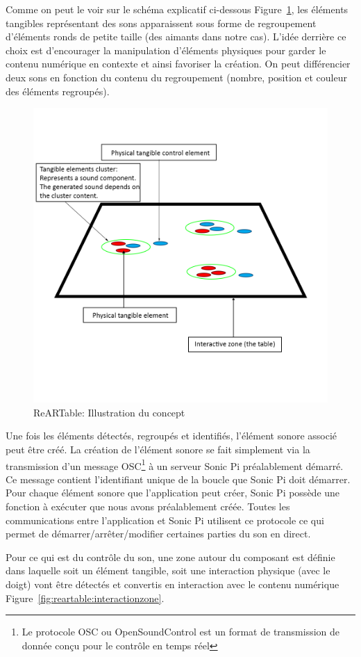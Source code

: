 Comme on peut le voir sur le schéma explicatif ci-dessous Figure~\ref{fig:reartable:generalscheme}, les éléments tangibles représentant des sons apparaissent sous forme de regroupement d'éléments ronds de petite taille (des aimants dans notre cas). L'idée derrière ce choix est d'encourager la manipulation d'éléments physiques pour garder le contenu numérique en contexte et ainsi favoriser la création. On peut différencier deux sons en fonction du contenu du regroupement (nombre, position et couleur des éléments regroupés).

\begin{figure}[H]
\centering
\includegraphics[width=0.5\linewidth]{images/rearproto}
\caption{ReARTable: Illustration du concept}
\label{fig:reartable:generalscheme}
\end{figure}

Une fois les éléments détectés, regroupés et identifiés, l'élément sonore associé peut être créé. La création de l'élément sonore se fait simplement via la transmission d'un message OSC\footnote{Le protocole OSC ou OpenSoundControl est un format de transmission de donnée conçu pour le contrôle en temps réel} à un serveur Sonic Pi préalablement démarré. Ce message contient l'identifiant unique de la boucle que Sonic Pi doit démarrer. Pour chaque élément sonore que l'application peut créer, Sonic Pi possède une fonction à exécuter que nous avons préalablement créée. Toutes les communications entre l'application et Sonic Pi utilisent ce protocole ce qui permet de démarrer/arrêter/modifier certaines parties du son en direct.

Pour ce qui est du contrôle du son, une zone autour du composant est définie dans laquelle soit un élément tangible, soit une interaction physique (avec le doigt) vont être détectés et convertis en interaction avec le contenu numérique Figure~\ref{fig:reartable:interactionzone}.

